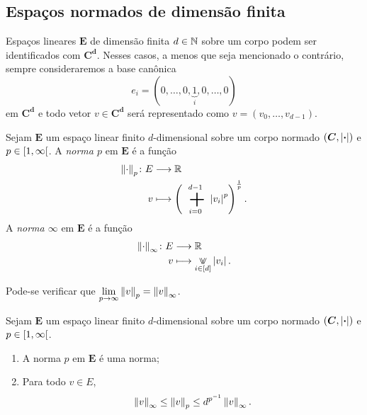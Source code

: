 \subsection{Espaços normados de dimensão finita}

Espaços lineares $\bm E$ de dimensão finita $d \in \mathbb{N}$ sobre um corpo podem ser identificados com $\bm{C^d}$. Nesses casos, a menos que seja mencionado o contrário, sempre consideraremos a base canônica
	\begin{equation*}
	e_i = (0,\dots,0,\underbrace{1}_i,0,\dots,0)
	\end{equation*}
em $\bm{C^d}$ e todo vetor $v \in \bm{C^d}$ será representado como $v=(v_0,\dots,v_{d-1})$.

\begin{definition}
Sejam $\bm E$ um espaço linear finito $d$-dimensional sobre um corpo normado $(\bm C,\left\vert{\bm{\cdot}}\right\vert)$ e $p \in \left[{1},{\infty}\right[$. A \emph{norma $p$} em $\bm E$ é a função
	\begin{align*}
	\func{\nor{\cdot}_p}{E}{\R}{v}{\left(\sum_{i=0}^{d-1}\abs{v_i}^p\right)^{\frac{1}{p}}}.
	\end{align*}
A \emph{norma $\infty$} em $\bm E$ é a função
	\begin{align*}
	\func{\nor{\cdot}_\infty}{E}{\R}{v}{\max_{i \in [d]} \abs{v_i}}.
	\end{align*}
\end{definition}

Pode-se verificar que $\displaystyle\lim_{p \rightarrow \infty} \left\Vert{v}\right\Vert_p = \left\Vert{v}\right\Vert_\infty$.

\begin{proposition}
Sejam $\bm E$ um espaço linear finito $d$-dimensional sobre um corpo normado $(\bm C,\left\vert{\bm{\cdot}}\right\vert)$ e $p \in \left[{1},{\infty}\right[$.
	\begin{enumerate}
	\item A norma $p$ em $\bm E$ é uma norma;
	\item Para todo $v \in E$,
		\begin{equation*}
		\left\Vert{v}\right\Vert_\infty \leq \left\Vert{v}\right\Vert_p \leq d^{p^{-1}}\left\Vert{v}\right\Vert_\infty.
		\end{equation*}
	\end{enumerate}
\end{proposition}

